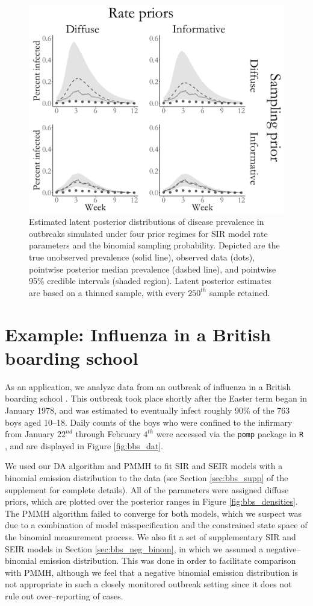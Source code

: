\begin{figure}[htbp]
	\centering
	\includegraphics[width=0.6\linewidth]{figures/prior_latent_posts.pdf}
	\caption{Estimated latent posterior distributions of disease prevalence in outbreaks simulated under four prior regimes for SIR model rate parameters and the binomial sampling probability. Depicted are the true unobserved prevalence (solid line), observed data (dots), pointwise posterior median prevalence (dashed line), and pointwise 95\% credible intervals (shaded region). Latent posterior estimates are based on a thinned sample, with every $250^{th}$ sample retained.}
	\label{fig:prior_latent_posts}
\end{figure}

\section{Example: Influenza in a British boarding school}
\label{sec:bda_bbs}

As an application, we analyze data from an outbreak of influenza in a British boarding school \citep{anon1978, davies1982}. This outbreak took place shortly after the Easter term began in January 1978, and was estimated to eventually infect roughly 90\% of the 763 boys aged 10--18. Daily counts of the boys who were confined to the infirmary from January $22^{nd}$ through February $4^{th}$ were accessed via the \texttt{pomp} package in \texttt{R} \citep{pomp}, and are displayed in Figure \ref{fig:bbs_dat}. 

We used our DA algorithm and PMMH to fit SIR and SEIR models with a binomial emission distribution to the data (see Section \ref{sec:bbs_supp} of the supplement for complete details). All of the parameters were assigned diffuse priors, which are plotted over the posterior ranges in Figure \ref{fig:bbs_densities}. The PMMH algorithm failed to converge for both models, which we suspect was due to a combination of model misspecification and the constrained state space of the binomial measurement process. We also fit a set of supplementary SIR and SEIR models in Section \ref{sec:bbs_neg_binom}, in which we assumed a negative--binomial emission distribution. This was done in order to facilitate comparison with PMMH, although we feel that a negative binomial emission distribution is not appropriate in such a closely monitored outbreak setting since it does not rule out over--reporting of cases.

